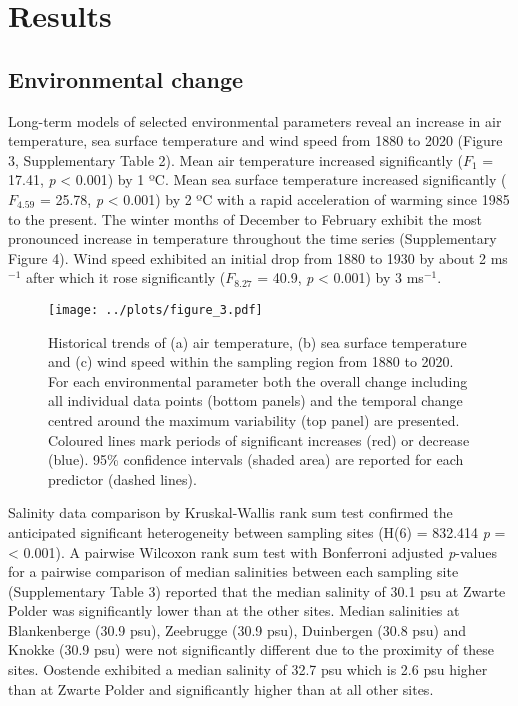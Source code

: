 \documentclass[smallextended]{svjour3}       %
\begin{document}
\hypertarget{results}{%
\section{Results}\label{results}}

\hypertarget{environmental-change}{%
\subsection{Environmental change}\label{environmental-change}}

Long-term models of selected environmental parameters reveal an increase
in air temperature, sea surface temperature and wind speed from 1880 to
2020 (Figure 3, Supplementary Table 2). Mean air temperature increased
significantly (\(F_{1}\) = 17.41, \emph{p} \textless{} 0.001) by 1 ºC.
Mean sea surface temperature increased significantly (\(F_{4.59}\) =
25.78, \emph{p} \textless{} 0.001) by 2 ºC with a rapid acceleration of
warming since 1985 to the present. The winter months of December to
February exhibit the most pronounced increase in temperature throughout
the time series (Supplementary Figure 4). Wind speed exhibited an
initial drop from 1880 to 1930 by about 2 ms\(^{-1}\) after which it
rose significantly (\(F_{8.27}\) = 40.9, \emph{p} \textless{} 0.001) by
3 ms\(^{-1}\).

\begin{figure}
\centering
\texttt{[image: ../plots/figure\_3.pdf]}
\caption{Historical trends of (a) air temperature, (b) sea surface
temperature and (c) wind speed within the sampling region from 1880 to
2020. For each environmental parameter both the overall change including
all individual data points (bottom panels) and the temporal change
centred around the maximum variability (top panel) are presented.
Coloured lines mark periods of significant increases (red) or decrease
(blue). 95\% confidence intervals (shaded area) are reported for each
predictor (dashed lines).}
\end{figure}

Salinity data comparison by Kruskal-Wallis rank sum test confirmed the
anticipated significant heterogeneity between sampling sites (H(6) =
832.414 \emph{p} = \textless{} 0.001). A pairwise Wilcoxon rank sum test
with Bonferroni adjusted \emph{p}-values for a pairwise comparison of
median salinities between each sampling site (Supplementary Table 3)
reported that the median salinity of 30.1 psu at Zwarte Polder was
significantly lower than at the other sites. Median salinities at
Blankenberge (30.9 psu), Zeebrugge (30.9 psu), Duinbergen (30.8 psu) and
Knokke (30.9 psu) were not significantly different due to the proximity
of these sites. Oostende exhibited a median salinity of 32.7 psu which
is 2.6 psu higher than at Zwarte Polder and significantly higher than at
all other sites.
\end{document}
